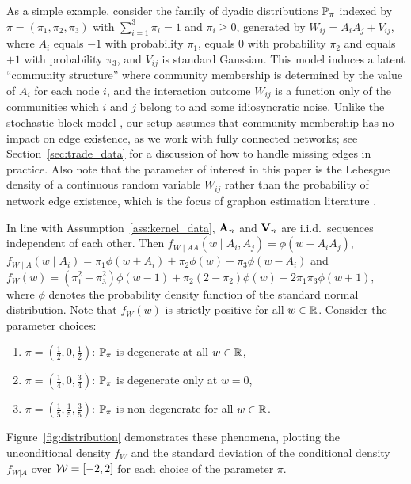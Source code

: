 As a simple example,
consider the family of dyadic distributions $\P_{\pi}$
indexed by $\pi = (\pi_1, \pi_2, \pi_3)$
with $\sum_{i=1}^3 \pi_i = 1$ and $\pi_i \geq 0$,
generated by $W_{ij} = A_i A_j + V_{ij}$,
where $A_i$ equals $-1$ with probability $\pi_1$,
equals $0$ with probability $\pi_2$
and equals $+1$ with probability $\pi_3$,
and $V_{ij}$ is standard Gaussian.
This model induces a latent
``community structure'' where community membership
is determined by the value of $A_i$ for each node $i$,
and the interaction outcome $W_{ij}$ is a function
only of the communities which $i$ and $j$ belong to and some
idiosyncratic noise.
Unlike the stochastic block model
\citep{kolaczyk2009statistical},
our setup assumes that
community membership has no impact on edge existence,
as we work with fully connected networks;
see Section~\ref{sec:trade_data} for a discussion of
how to handle missing edges in practice.
Also note that the parameter of interest in this paper is the Lebesgue density
of a continuous random variable $W_{ij}$
rather than the probability of network edge existence,
which is the focus of graphon estimation
literature \citep{gao2021minimax}.

In line with Assumption~\ref{ass:kernel_data}, $\bA_n$ and $\bV_n$ are i.i.d.\
sequences independent of each other.
Then
$f_{W \mid AA}(w \mid A_i, A_j) = \phi(w - A_i A_j)$,\,
$f_{W \mid A}(w \mid A_i) = \pi_1 \phi(w + A_i) + \pi_2 \phi(w)
+ \pi_3 \phi(w - A_i)$
and
$f_W(w) = (\pi_1^2 + \pi_3^2) \phi(w-1) + \pi_2 (2 - \pi_2) \phi(w) + 2
\pi_1 \pi_3 \phi(w+1),$
where $\phi$ denotes the probability density function of
the standard normal distribution.
Note that $f_W(w)$ is strictly positive for all $w \in \R$.
Consider the parameter choices:
%
\begin{enumerate}[label=(\roman*)]\onehalfspacing

  \item $\pi = \left( \frac{1}{2}, 0, \frac{1}{2} \right)$:\quad
    $\P_\pi$ is degenerate at all $w \in \R$,

  \item $\pi = \left( \frac{1}{4}, 0, \frac{3}{4} \right)$:\quad
    $\P_\pi$ is degenerate only at $w=0$,

  \item $\pi = \left( \frac{1}{5}, \frac{1}{5}, \frac{3}{5} \right)$:\quad
    $\P_\pi$ is non-degenerate for all $w \in \R$.

\end{enumerate}
%
Figure~\ref{fig:distribution} demonstrates these phenomena,
plotting the unconditional density $f_W$
and the standard deviation of the conditional density $f_{W|A}$
over $\cW = [-2,2]$ for each choice of the parameter $\pi$.

